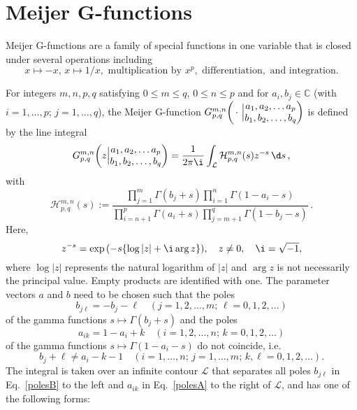 
\section{Meijer G-functions}%
\label{sub:tensors.meijer}

Meijer G-functions are a family of special functions in one variable that is closed under several operations including
\[
  x \mapsto -x, \,
  x \mapsto 1/x,
  \text{ multiplication by } x^p,
  \text{ differentiation},
  \text{ and integration}.
\]
%
\begin{definition}\label{Def:MeijerG}
  For integers $m,n,p,q$ satisfying $0\leq m \leq q$, $0 \leq n \leq p$ and for $a_i, b_j \in \mathbb{C}$ (with $i=1,\ldots,p$; $j=1,\ldots,q$), the Meijer G-function
  $G_{p,q}^{m,n}{\left(\, \cdot \,\, \Big| \begin{matrix} a_1,a_2, \ldots a_p \\ b_1, b_2,\ldots, b_q\end{matrix}\right)}$ is defined by the line integral
  \[
    \label{eq:the_G}
    G_{p,q}^{m,n}\roundbra{z \Big| \begin{matrix} a_1,a_2, \ldots a_p \\ b_1, b_2,\ldots, b_q\end{matrix}}
    =
    \frac{1}{2\pi \i} \int_{\mathcal{L}} \mathcal{H}_{p,q}^{m,n} (s) z^{-s} \, \d s \, ,
  \]
  with
  \[\label{Hmnpq}
    \mathcal{H}_{p,q}^{m,n}(s) :=   \frac{\prod_{j=1}^m \Gamma(b_j+s) \prod_{i=1}^n \Gamma(1-a_i-s)}{\prod_{i=n+1}^p \Gamma(a_i+s) \prod_{j=m+1}^q \Gamma(1-b_j-s)}
    \,.
  \]
  Here,
  \[
    z^{-s}=\exp\roundbra{-s \curlybra{\log |z|+ \i \arg z}}, \quad z \neq 0, \quad \i=\sqrt{-1},
  \]
  where $\log|z|$ represents the natural logarithm of $|z|$ and $\arg z$ is not necessarily the principal value.
  Empty products are identified with one.
  The parameter vectors $a$ and $b$ need to be chosen such that the poles
  \[\label{polesB}
    b_{j\ell} = -b_j - \ell \quad (j=1,2,\ldots,m;\, \ell=0,1,2,\ldots)
  \]
  of the gamma functions $s\mapsto \Gamma(b_j+s)$ and the poles
  \[\label{polesA}
    a_{ik} = 1-a_i+k \quad (i=1,2,\ldots,n;\, k=0,1,2,\ldots)
  \]
  of the gamma functions $s\mapsto \Gamma(1-a_i-s)$ do not coincide, i.e.
  \[
    b_j+\ell \neq a_i-k-1 \quad (i=1,\ldots,n;\, j=1,\ldots,m;\,  k,\ell=0,1,2,\ldots).
  \]
  The integral is taken over an infinite contour $\mathcal{L}$ that separates all  poles $b_{j\ell}$ in Eq.~\eqref{polesB} to the left and $a_{ik}$ in Eq.~\eqref{polesA} to the right of $\mathcal{L}$, and has one of the following forms:

\end{definition}
